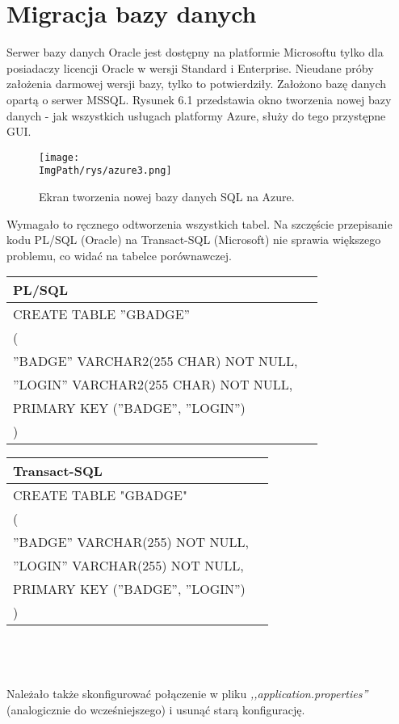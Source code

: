 \documentclass[a4paper,12pt,twoside,openany]{report}
\newcommand{\ImgPath}{.}
\begin{document}
\section{Migracja bazy danych}
Serwer bazy danych Oracle jest dostępny na platformie Microsoftu tylko dla posiadaczy licencji Oracle w wersji Standard i Enterprise. Nieudane próby założenia darmowej wersji bazy, tylko to potwierdziły. Założono bazę danych opartą o serwer MSSQL. Rysunek 6.1 przedstawia okno tworzenia nowej bazy danych - jak wszystkich usługach platformy Azure, służy do tego przystępne GUI.
				\begin{figure}[!htbp]
					\begin{center}
						\centering
						\texttt{[image: \\ImgPath/rys/azure3.png]}
					\end{center}
					\caption{Ekran tworzenia nowej bazy danych SQL na Azure.}
					\label{UMLTS}
				\end{figure}
Wymagało to ręcznego odtworzenia wszystkich tabel. Na szczęście przepisanie kodu PL/SQL (Oracle) na Transact-SQL (Microsoft) nie sprawia większego problemu, co widać na tabelce porównawczej.\\
\begin{tabular}{|p{7cm}|p{7cm}|}
	\hline PL/SQL\\ 
	\hline   CREATE TABLE ''GBADGE''  \\
	(\\	
	''BADGE'' VARCHAR2(255 CHAR) NOT NULL, \\
	''LOGIN'' VARCHAR2(255 CHAR) NOT NULL,  \\
	PRIMARY KEY (''BADGE'', ''LOGIN'')\\
	)\\
	\hline 
\end{tabular} 
\begin{tabular}{|p{7cm}|p{7cm}|}
	\hline Transact-SQL\\ 
	\hline CREATE TABLE "GBADGE" \\
	(\\
	''BADGE'' VARCHAR(255) NOT NULL, \\
	''LOGIN'' VARCHAR(255) NOT NULL, \\
	PRIMARY KEY (''BADGE'', ''LOGIN'')\\
	)\\
	\hline 
\end{tabular}\\\\\\
Należało także skonfigurować połączenie w pliku \textit{,,application.properties''} (analogicznie do wcześniejszego) i usunąć starą konfigurację.
\end{document}
